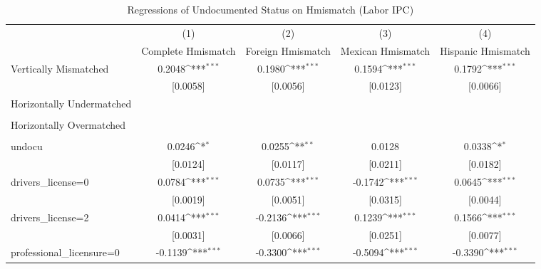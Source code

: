 \begin{table}[htbp]\centering
\def\sym#1{\ifmmode^{#1}\else\(^{#1}\)\fi}
\caption{Regressions of Undocumented Status on Hmismatch (Labor IPC)}
\begin{tabular}{l*{4}{c}}
\toprule
                    &\multicolumn{1}{c}{(1)}         &\multicolumn{1}{c}{(2)}         &\multicolumn{1}{c}{(3)}         &\multicolumn{1}{c}{(4)}         \\
                    &Complete Hmismatch         &Foreign Hmismatch         &Mexican Hmismatch         &Hispanic Hmismatch         \\
\midrule
Vertically Mismatched&      0.2048\sym{***}&      0.1980\sym{***}&      0.1594\sym{***}&      0.1792\sym{***}\\
                    &    [0.0058]         &    [0.0056]         &    [0.0123]         &    [0.0066]         \\
\addlinespace
Horizontally Undermatched&                     &                     &                     &                     \\
                    &                     &                     &                     &                     \\
\addlinespace
Horizontally Overmatched&                     &                     &                     &                     \\
                    &                     &                     &                     &                     \\
\addlinespace
undocu              &      0.0246\sym{*}  &      0.0255\sym{**} &      0.0128         &      0.0338\sym{*}  \\
                    &    [0.0124]         &    [0.0117]         &    [0.0211]         &    [0.0182]         \\
\addlinespace
drivers\_license=0   &      0.0784\sym{***}&      0.0735\sym{***}&     -0.1742\sym{***}&      0.0645\sym{***}\\
                    &    [0.0019]         &    [0.0051]         &    [0.0315]         &    [0.0044]         \\
\addlinespace
drivers\_license=2   &      0.0414\sym{***}&     -0.2136\sym{***}&      0.1239\sym{***}&      0.1566\sym{***}\\
                    &    [0.0031]         &    [0.0066]         &    [0.0251]         &    [0.0077]         \\
\addlinespace
professional\_licensure=0&     -0.1139\sym{***}&     -0.3300\sym{***}&     -0.5094\sym{***}&     -0.3390\sym{***}\\

\end{tabular}
\end{table}
